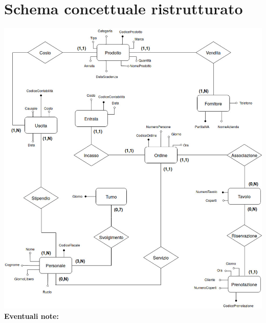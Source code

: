 \section{Schema concettuale ristrutturato}
\includegraphics[width=1\textwidth]{doc/Ristrutturato}
\textbf{Eventuali note:}  
